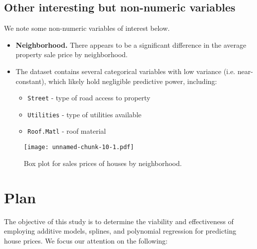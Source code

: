 \documentclass[aoas]{imsart}
\numberwithin{equation}{section}
\theoremstyle{plain}
\theoremstyle{remark}
\begin{document}
\hfill\break

\hypertarget{other-interesting-but-non-numeric-variables}{%
\subsection{Other interesting but non-numeric
variables}\label{other-interesting-but-non-numeric-variables}}

\hfill\break

We note some non-numeric variables of interest below.

\begin{itemize}
    \item \textbf{Neighborhood.} There appears to
be a significant difference in the average property sale price by neighborhood.
\vspace{0.2cm}
\item The dataset contains several categorical variables with low variance (i.e. near-constant), which likely hold negligible predictive power, including:
\vspace{0.2cm}
\begin{itemize}
    \item \texttt{Street} - type of road access to property
    \item \texttt{Utilities} - type of utilities available
    \item \texttt{Roof.Matl} - roof material
\end{itemize}
\end{itemize}

\begin{figure}
\centering
\texttt{[image: unnamed-chunk-10-1.pdf]}
\caption{Box plot for sales prices of houses by neighborhood.\label{}}
\end{figure}

\newpage

\hypertarget{plan}{%
\section{Plan}\label{plan}}

\hfill\break 

The objective of this study is to determine the
viability and effectiveness of employing additive models, splines, and
polynomial regression for predicting house prices. We focus our attention on the following:
\end{document}
